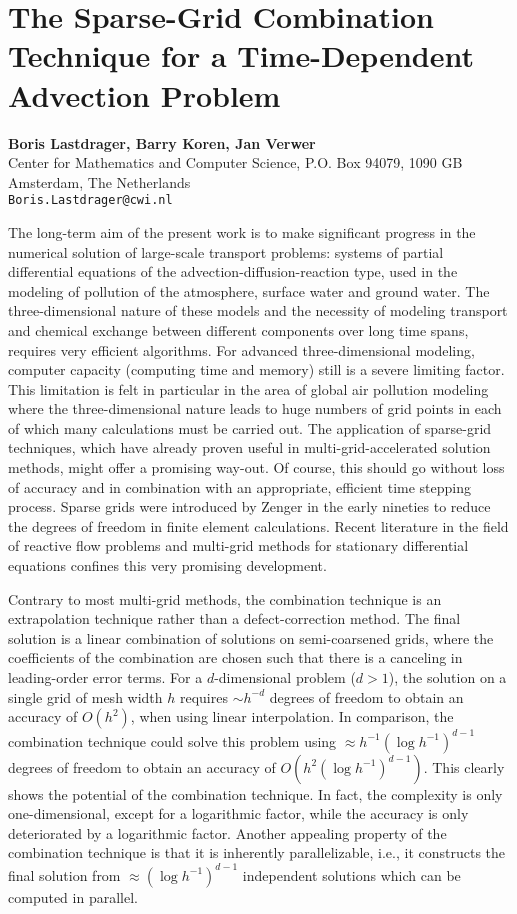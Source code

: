 \documentclass[11pt]{article}
\newcommand{\nextab}[4]{
	\section{#2}
	{\bf #1} \\ \nopagebreak
	{#3} \\ \nopagebreak
	{\tt #4} \nopagebreak
	}
\begin{document}

\nextab{Boris Lastdrager, Barry Koren, Jan Verwer}
	{The Sparse-Grid Combination Technique for a
		Time-Dependent Advection Problem}
	{Center for Mathematics and Computer Science,
	P.O. Box 94079, 1090 GB  Amsterdam, The Netherlands}
	{Boris.Lastdrager@cwi.nl}

The long-term aim of the present work is to make significant progress in the
numerical solution of large-scale transport problems:
systems of partial differential equations of the advection-diffusion-reaction
type, used in the modeling of pollution of
the atmosphere, surface water and ground water.
The three-dimensional nature of these models and the necessity of
modeling transport and
chemical exchange between different components over long time spans,
requires very efficient algorithms. For advanced three-dimensional modeling,
computer capacity (computing time and memory) still is a severe
limiting factor. This limitation is felt in particular in the area of
global air pollution modeling where the three-dimensional
nature leads to huge numbers
of grid points in each of which many calculations must be carried out.
The application of sparse-grid techniques,
which have already proven useful in multi-grid-accelerated solution methods,
might offer a promising way-out.
Of course, this should go without loss of accuracy and
in combination with an appropriate, efficient time stepping process.
Sparse grids were introduced by Zenger in the early nineties
to reduce the degrees of freedom in finite element calculations.
Recent literature in the field of reactive flow problems and multi-grid methods
for stationary differential equations confines this very promising development.

Contrary to most multi-grid methods, the combination technique
is an extrapolation technique rather than a defect-correction method. The
final solution is a linear combination of solutions on semi-coarsened grids,
where the coefficients of the combination are chosen such that there is a
canceling in leading-order error terms. For a $d$-dimensional problem
($d>1$), the solution on a single grid of mesh width $h$ requires
$\sim h^{-d}$
degrees of freedom to obtain an accuracy of $O(h^2)$,
when using linear interpolation. In comparison, the combination technique could
solve this problem using $\approx h^{-1}(\log h^{-1})^{d-1}$
degrees of freedom to obtain an accuracy of
$O(h^2 (\log h^{-1})^{d-1})$.
This clearly
shows the potential of the combination technique. In fact, the
complexity is only one-dimensional, except for a logarithmic factor, while the
accuracy is only deteriorated by a logarithmic factor. Another appealing
property of the combination technique is that it is inherently parallelizable,
i.e., it constructs the final solution from
$\approx (\log h^{-1})^{d-1}$
independent solutions which can be computed
in parallel.
\end{document}
